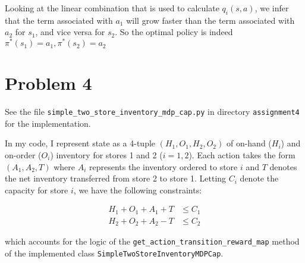 \documentclass{article}
\begin{document}
Looking at the linear combination that is used to calculate $q_i(s,a)$, we infer that the term associated with $a_1$ will grow faster than the term associated with $a_2$ for $s_1$, and vice versa for $s_2$. So the optimal policy is indeed $\pi^*(s_1)=a_1, \pi^*(s_2)=a_2$

\section*{Problem 4}

See the file \texttt{simple\_two\_store\_inventory\_mdp\_cap.py} in directory \texttt{assignment4} for the implementation.

In my code, I represent state as a 4-tuple $(H_1, O_1, H_2, O_2)$ of on-hand ($H_i$) and on-order ($O_i$) inventory for stores 1 and 2 ($i=1,2$). Each action takes the form $(A_1, A_2, T)$ where $A_i$ represents the inventory ordered to store $i$ and $T$ denotes the net inventory transferred from store 2 to store 1. Letting $C_i$ denote the capacity for store $i$, we have the following constraints:

\begin{align}
    H_1 + O_1 + A_1 + T &\leq C_1\\
    H_2 + O_2 + A_2 - T &\leq C_2
\end{align}

which accounts for the logic of the \texttt{get\_action\_transition\_reward\_map} method of the implemented class \texttt{SimpleTwoStoreInventoryMDPCap}.
\end{document}
